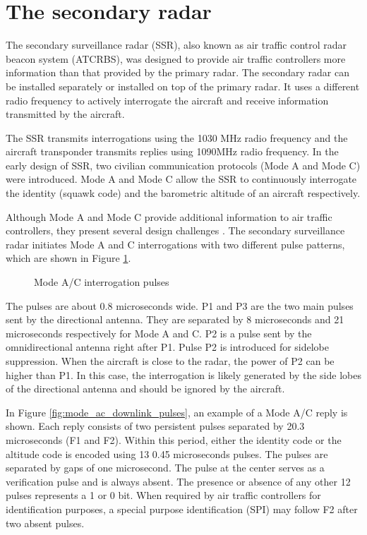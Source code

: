 \section{The secondary radar}

The secondary surveillance radar (SSR), also known as air traffic control radar beacon system (ATCRBS), was designed to provide air traffic controllers more information than that provided by the primary radar. The secondary radar can be installed separately or installed on top of the primary radar. It uses a different radio frequency to actively interrogate the aircraft and receive information transmitted by the aircraft.

The SSR transmits interrogations using the 1030 MHz radio frequency and the aircraft transponder transmits replies using 1090MHz radio frequency. In the early design of SSR, two civilian communication protocols (Mode A and Mode C) were introduced. Mode A and Mode C allow the SSR to continuously interrogate the identity (squawk code) and the barometric altitude of an aircraft respectively.

Although Mode A and Mode C provide additional information to air traffic controllers, they present several design challenges \cite{icao1983}. The secondary surveillance radar initiates Mode A and C interrogations with two different pulse patterns, which are shown in Figure \ref{fig:mode_ac_uplink_pulses}.

\begin{figure}[ht]
  \scalebox{0.9}{
    
  }
  \caption{Mode A/C interrogation pulses}
  \label{fig:mode_ac_uplink_pulses}
\end{figure}

The pulses are about 0.8 microseconds wide. P1 and P3 are the two main pulses sent by the directional antenna. They are separated by 8 microseconds and 21 microseconds respectively for Mode A and C. P2 is a pulse sent by the omnidirectional antenna right after P1. Pulse P2 is introduced for sidelobe suppression. When the aircraft is close to the radar, the power of P2 can be higher than P1. In this case, the interrogation is likely generated by the side lobes of the directional antenna and should be ignored by the aircraft.

In Figure \ref{fig:mode_ac_downlink_pulses}, an example of a Mode A/C reply is shown. Each reply consists of two persistent pulses separated by 20.3 microseconds (F1 and F2). Within this period, either the identity code or the altitude code is encoded using 13 0.45 microseconds pulses. The pulses are separated by gaps of one microsecond. The pulse at the center serves as a verification pulse and is always absent. The presence or absence of any other 12 pulses represents a 1 or 0 bit. When required by air traffic controllers for identification purposes, a special purpose identification (SPI) may follow F2 after two absent pulses.

